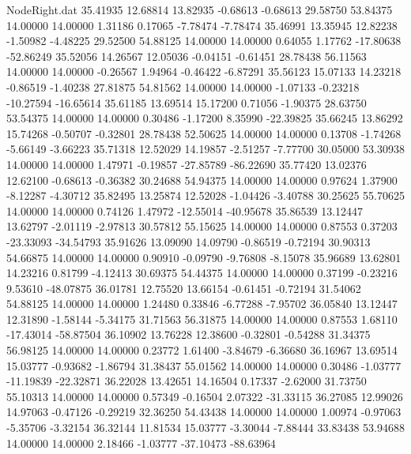 \begin{filecontents}{NodeRight.dat}
  35.41935   12.68814   13.82935    -0.68613   -0.68613   29.58750   53.84375   14.00000   14.00000    1.31186    0.17065   -7.78474   -7.78474
  35.46991   13.35945   12.82238    -1.50982   -4.48225   29.52500   54.88125   14.00000   14.00000    0.64055    1.17762  -17.80638  -52.86249
  35.52056   14.26567   12.05036    -0.04151   -0.61451   28.78438   56.11563   14.00000   14.00000   -0.26567    1.94964   -0.46422   -6.87291
  35.56123   15.07133   14.23218    -0.86519   -1.40238   27.81875   54.81562   14.00000   14.00000   -1.07133   -0.23218  -10.27594  -16.65614
  35.61185   13.69514   15.17200     0.71056   -1.90375   28.63750   53.54375   14.00000   14.00000    0.30486   -1.17200    8.35990  -22.39825
  35.66245   13.86292   15.74268    -0.50707   -0.32801   28.78438   52.50625   14.00000   14.00000    0.13708   -1.74268   -5.66149   -3.66223
  35.71318   12.52029   14.19857    -2.51257   -7.77700   30.05000   53.30938   14.00000   14.00000    1.47971   -0.19857  -27.85789  -86.22690
  35.77420   13.02376   12.62100    -0.68613   -0.36382   30.24688   54.94375   14.00000   14.00000    0.97624    1.37900   -8.12287   -4.30712
  35.82495   13.25874   12.52028    -1.04426   -3.40788   30.25625   55.70625   14.00000   14.00000    0.74126    1.47972  -12.55014  -40.95678
  35.86539   13.12447   13.62797    -2.01119   -2.97813   30.57812   55.15625   14.00000   14.00000    0.87553    0.37203  -23.33093  -34.54793
  35.91626   13.09090   14.09790    -0.86519   -0.72194   30.90313   54.66875   14.00000   14.00000    0.90910   -0.09790   -9.76808   -8.15078
  35.96689   13.62801   14.23216     0.81799   -4.12413   30.69375   54.44375   14.00000   14.00000    0.37199   -0.23216    9.53610  -48.07875
  36.01781   12.75520   13.66154    -0.61451   -0.72194   31.54062   54.88125   14.00000   14.00000    1.24480    0.33846   -6.77288   -7.95702
  36.05840   13.12447   12.31890    -1.58144   -5.34175   31.71563   56.31875   14.00000   14.00000    0.87553    1.68110  -17.43014  -58.87504
  36.10902   13.76228   12.38600    -0.32801   -0.54288   31.34375   56.98125   14.00000   14.00000    0.23772    1.61400   -3.84679   -6.36680
  36.16967   13.69514   15.03777    -0.93682   -1.86794   31.38437   55.01562   14.00000   14.00000    0.30486   -1.03777  -11.19839  -22.32871
  36.22028   13.42651   14.16504     0.17337   -2.62000   31.73750   55.10313   14.00000   14.00000    0.57349   -0.16504    2.07322  -31.33115
  36.27085   12.99026   14.97063    -0.47126   -0.29219   32.36250   54.43438   14.00000   14.00000    1.00974   -0.97063   -5.35706   -3.32154
  36.32144   11.81534   15.03777    -3.30044   -7.88444   33.83438   53.94688   14.00000   14.00000    2.18466   -1.03777  -37.10473  -88.63964

\end{filecontents}
